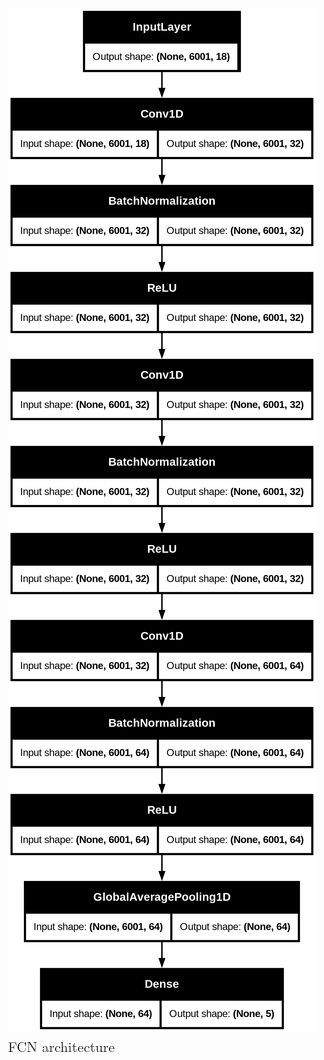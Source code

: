 \begin{figure}[H]
\centering
\includegraphics[scale=.1, angle=90]{figs/fcn.png}
\caption{FCN architecture}
\label{fig1}
\end{figure}


